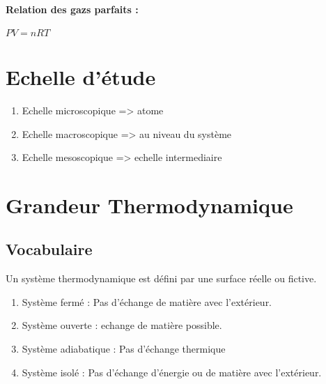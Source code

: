 \documentclass[a4paper,10pt]{report}
\begin{document}
 \paragraph{Relation des gazs parfaits :}
 \begin{math}
  PV=nRT
 \end{math}
\section{Echelle d'étude}
\begin{enumerate}
 \item Echelle microscopique => atome
 \item Echelle macroscopique => au niveau du système
 \item Echelle mesoscopique => echelle intermediaire
\end{enumerate}
\section{Grandeur Thermodynamique}
\subsection{Vocabulaire}
Un système thermodynamique est défini par une surface réelle ou fictive.
\begin{enumerate}
 \item Système fermé : Pas d'échange de matière avec l'extérieur.
 \item Système ouverte : echange de matière possible.
 \item Système adiabatique : Pas d'échange thermique
 \item Système isolé : Pas d'échange d'énergie ou de matière avec l'extérieur.
\end{enumerate}
\end{document}
